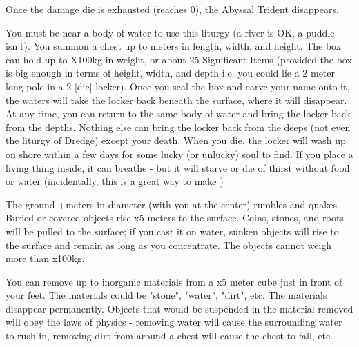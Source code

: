 Once the damage die is exhausted (reaches 0), the Abyssal Trident disappears.

\MYSTERY [
  Name = Davy Jones's Locker,
  Link = arcana-mystery-davy-joness-locker,
  Paradigm = Prophesy,
  Save = N,
  Duration = Instant,
  Target = Close Target(s)
]

You must be near a body of water to use this liturgy (a river is OK, a puddle isn't).  You summon a chest up to \DICE meters in length, width, and height.  The box can hold up to \DICE X100kg in weight, or about 25 Significant Items (provided the box is big enough in terms of height, width, and depth i.e. you could lie a 2 meter long pole in a 2 [die] locker).  Once you seal the box and carve your name onto it, the waters will take the locker back beneath the surface, where it will disappear.  At any time, you can return to the same body of water and bring the locker back from the depths. Nothing else can bring the locker back from the deeps (not even the liturgy of Dredge) except your death.  When you die, the locker will wash up on shore within a few days for some lucky (or unlucky) soul to find.
If you place a living thing inside, it can breathe - but it will starve or die of thirst without food or water (incidentally, this is a great way to make )

\MYSTERY [
  Name = Dredge,
  Link = arcana-mystery-dredge,
  Paradigm = Mind,
  Save = N,
  Duration = Concentration,
  Target = Close or Nearby
]

The ground \DICE+\DICE meters in diameter (with you at the center) rumbles and quakes.  Buried or covered objects rise \DICE x5 meters to the surface.  Coins, stones, and roots will be pulled to the surface; if you cast it on water, sunken objects will rise to the surface and remain as long as you concentrate.  The objects cannot weigh more than \DICE x100kg.  

\MYSTERY [
  Name = Excavate,
  Link = arcana-mystery-excavate,
  Paradigm = Elements,
  Save = N,
  Duration = Instant,
  Target = Close
]

You can remove up to \DICE inorganic materials from a \DICE x5 meter cube just in front of your feet.  The materials could be "stone", "water", "dirt", etc. The materials disappear permanently. Objects that would be suspended in the material removed will obey the laws of physics - removing water will cause the surrounding water to rush in, removing dirt from around a chest will cause the chest to fall, etc.

\MYSTERY [
  Name = Fade,
  Link = arcana-mystery-fade,
  Paradigm = Mind,
  Save = Y (neg.),
  Duration = Markovian,
  Target = Nearby Target(s)
]

